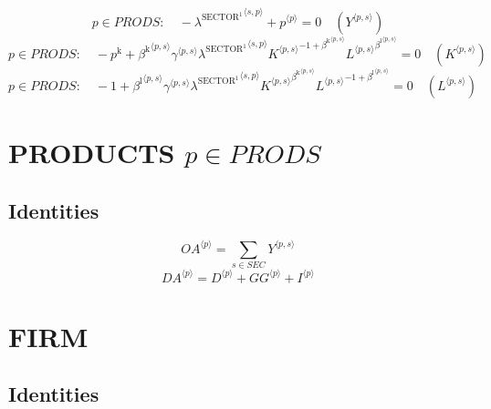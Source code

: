 \begin{equation}
p\in {P\!R\!O\!D\!S}\colon\quad -{\lambda^{\mathrm{SECTOR}^{\mathrm{1}}}}^{\langle s,p\rangle} + {p}^{\langle p\rangle} = 0
 \quad \left({Y}^{\langle p,s\rangle}\right)
\end{equation}
\begin{equation}
p\in {P\!R\!O\!D\!S}\colon\quad -p^{\mathrm{k}} + {{\beta^{\mathrm{k}}}^{\langle p,s\rangle}} {{\gamma}^{\langle p,s\rangle}} {{\lambda^{\mathrm{SECTOR}^{\mathrm{1}}}}^{\langle s,p\rangle}} {{{K}^{\langle p,s\rangle}}^{-1 + {\beta^{\mathrm{k}}}^{\langle p,s\rangle}}} {{{L}^{\langle p,s\rangle}}^{{\beta^{\mathrm{l}}}^{\langle p,s\rangle}}} = 0
 \quad \left({K}^{\langle p,s\rangle}\right)
\end{equation}
\begin{equation}
p\in {P\!R\!O\!D\!S}\colon\quad -1 + {{\beta^{\mathrm{l}}}^{\langle p,s\rangle}} {{\gamma}^{\langle p,s\rangle}} {{\lambda^{\mathrm{SECTOR}^{\mathrm{1}}}}^{\langle s,p\rangle}} {{{K}^{\langle p,s\rangle}}^{{\beta^{\mathrm{k}}}^{\langle p,s\rangle}}} {{{L}^{\langle p,s\rangle}}^{-1 + {\beta^{\mathrm{l}}}^{\langle p,s\rangle}}} = 0
 \quad \left({L}^{\langle p,s\rangle}\right)
\end{equation}




\section{PRODUCTS $p\in {P\!R\!O\!D\!S}$}

\subsection{Identities}

\begin{equation}
{{O\!A}}^{\langle p\rangle} = \sum_{s\in {S\!E\!C}} {Y}^{\langle p,s\rangle}
\end{equation}
\begin{equation}
{{D\!A}}^{\langle p\rangle} = {D}^{\langle p\rangle} + {{G\!G}}^{\langle p\rangle} + {I}^{\langle p\rangle}
\end{equation}




\section{FIRM}

\subsection{Identities}

